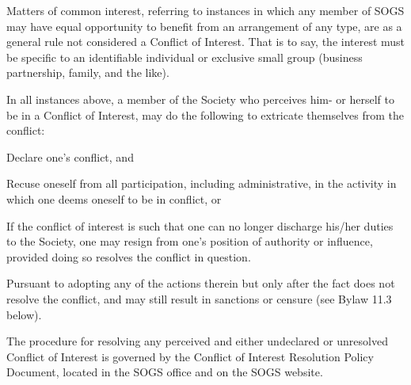 \begin{longenum}[ label*=\thesection.\arabic*., align=left]
\begin{itemize}
    \end{itemize}
    \begin{longenum}[ label*=\arabic*., align=left]
	\item Matters of common interest, referring to instances in which any member of SOGS may have equal opportunity to  benefit from an arrangement of any type, are as a general  rule not considered a Conflict of Interest. That is to say, the interest must be specific to an identifiable individual or exclusive small group (business partnership, family, and the like). 
	\end{longenum}
    \item In all instances above, a member of the Society who perceives him- or herself to be in a Conflict of Interest, may do the following to extricate themselves from the conflict:
    \begin{longenum}[ label*=\arabic*., align=left]
		\item Declare one's conflict, and
        \begin{longenum}[ label*=\arabic*., align=left]
			\item Recuse oneself from all participation, including administrative, in the activity in which one deems oneself to be in conflict, or
            \item If the conflict of interest is such that one can no longer discharge his/her duties to the Society, one may resign from one's position of authority or influence, provided doing so resolves the conflict in question.
		\end{longenum}
        \item Pursuant to adopting any of the actions therein but only after the fact does not resolve the conflict, and may still result in sanctions or censure (see Bylaw 11.3 below).
	\end{longenum}
    \item The procedure for resolving any perceived and either undeclared or unresolved Conflict of Interest is governed by the Conflict of Interest Resolution Policy Document, located in the SOGS office and on the SOGS website.
    
\end{longenum}

\newpage

